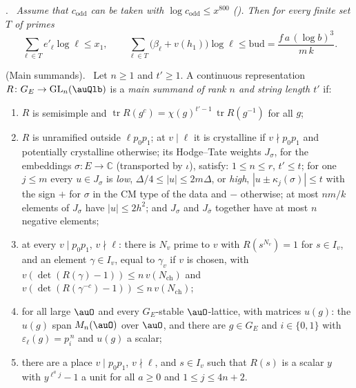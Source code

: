 \documentclass[10pt]{amsart}
\theoremstyle{definition}
\theoremstyle{remark}
\newcommand{\C}{\mathbb C}
\providecommand{\auGL}{\mathrm{GL}}
\providecommand{\aubar}[1]{\overline{#1}}
\providecommand{\aubud}{\mathrm{bud}}
\providecommand{\pgG}{G_E}
\providecommand{\pgNch}{N_{\mathrm{ch}}}
\providecommand{\pgcodd}{c_{\mathrm{odd}}}
\providecommand{\pgcyc}{\varepsilon_\ell}
\providecommand{\pgtr}{\operatorname{tr}}
\providecommand{\pgv}{v}
\newenvironment{quotedthm}[2]{\par\medskip\noindent\begingroup
  \textbf{#1}#2.\ \itshape\ignorespaces}{\endgroup\par\medskip}
\newenvironment{quoteddef}[2]{\par\medskip\noindent\begingroup
  \textbf{#1}#2.\ \ignorespaces}{\endgroup\par\medskip}
\begin{document}
\begin{quotedthm}{\cite[Lemma~2.5]{P55}}{}
Assume that $\pgcodd$ can be taken with $\log\pgcodd\le x^{800}$ ({\cite[Proposition~2.27]{P55}}). Then
for every finite set $T$ of primes
\[
\sum_{\ell\in T}e'_\ell\log\ell\le x_1,\qquad
\sum_{\ell\in T}\bigl(\beta_\ell+\pgv(h_1)\bigr)\log\ell\le\aubud=\frac{f\,a\,(\log b)^3}{m\,k}.
\]
\end{quotedthm}

\begin{quoteddef}{\cite[Definition~2.6]{P55}}{ (Main summands)}
Let $n\ge1$ and $t'\ge1$. A continuous representation $R\colon\pgG\to\auGL_n(\auQlb)$ is a
\emph{main summand of rank $n$ and string length $t'$} if:
\begin{enumerate}
\item[(M1)] $R$ is semisimple and $\pgtr R(g^c)=\chi(g)^{t'-1}\,\pgtr R(g^{-1})$ for all $g$;
\item[(M2)] $R$ is unramified outside $\ell p_0p_1$; at $v\mid\ell$ it is crystalline if
$v\nmid p_0p_1$ and potentially crystalline otherwise; its Hodge--Tate weights $J_\sigma$, for
the embeddings $\sigma\colon E\to\C$ (transported by $\iota$), satisfy:
$1\le n\le r$, $t'\le t$; for one $j\le m$ every $u\in J_\sigma$ is \emph{low},
$\Delta/4\le|u|\le2m\Delta$, or \emph{high}, $|u\pm\kappa_j(\sigma)|\le t$ with the sign $+$ for
$\sigma$ in the CM type of the data and $-$ otherwise; at most $nm/k$ elements of $J_\sigma$ have
$|u|\le2h^2$; and $J_\sigma$ and $J_{\aubar\sigma}$ together have at most $n$ negative elements;
\item[(M3)] at every $v\mid p_0p_1$, $v\nmid\ell$: there is $N_v$ prime to $v$ with $R(s^{N_v})=1$
for $s\in I_v$, and an element $\gamma\in I_v$, equal to $\gamma_v$ if $v$ is chosen, with
$\pgv(\det(R(\gamma)-1))\le n\,\pgv(\pgNch)$ and $\pgv(\det(R(\gamma^{-c})-1))\le n\,\pgv(\pgNch)$;
\item[(M4)] for all large $\auO$ and every $\pgG$-stable $\auO$-lattice, with matrices $u(g)$: the
$u(g)$ span $M_n(\auO)$ over $\auO$, and there are $g\in\pgG$ and $i\in\{0,1\}$ with
$\pgcyc(g)=p_i^{\,n}$ and $u(g)$ a scalar;
\item[(M5)] there are a place $v\mid p_0p_1$, $v\nmid\ell$, and $s\in I_v$ such that $R(s)$ is a
scalar $y$ with $y^{\ell^aj}-1$ a unit for all $a\ge0$ and $1\le j\le4n+2$.
\end{enumerate}
\end{quoteddef}
\end{document}
